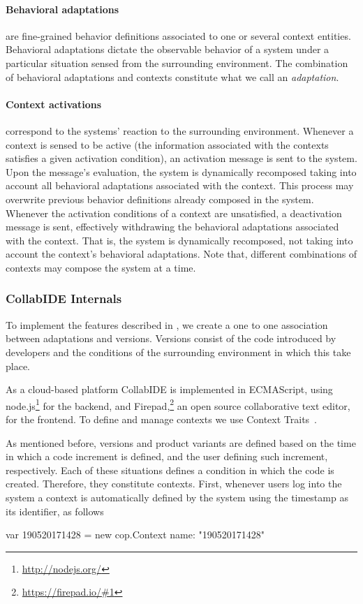 \paragraph{Behavioral adaptations} are fine-grained behavior definitions associated to one or several 
context entities. Behavioral adaptations dictate the observable behavior of a system under a particular 
situation sensed from the surrounding environment. The combination of behavioral adaptations and 
contexts constitute what we call an \emph{adaptation}.

\paragraph{Context activations} correspond to the systems' reaction to the surrounding environment. 
Whenever a context is sensed to be active (the information associated with the contexts satisfies a 
given activation condition), an activation message is sent to the system. Upon the message's 
evaluation, the system is dynamically recomposed taking into account all behavioral adaptations 
associated with the context. This process may overwrite previous behavior definitions already 
composed in the system. Whenever the activation conditions of a context are unsatisfied, a 
deactivation message is sent, effectively withdrawing the behavioral adaptations associated with the 
context. That is, the system is dynamically recomposed, not taking into account the context's 
behavioral adaptations.  Note that, different combinations of contexts may compose the system at a 
time.


\subsubsection{CollabIDE Internals}
To implement the features described in , we create a one to one association 
between adaptations and versions.
Versions consist of the code introduced by developers and the conditions of the surrounding 
environment in which this take place. 

As a cloud-based platform CollabIDE is implemented in ECMAScript, using 
node.js\footnote{\url{http://nodejs.org/}} for the backend, and 
Firepad,\footnote{\url{https://firepad.io/\#1}} 
an open source collaborative text editor, for the frontend.
To define and manage contexts we use Context Traits~\cite{gonzalez13}. 

As mentioned before, versions and product variants are defined based on the time in which a code 
increment is defined, and the user defining such increment, respectively. Each of these situations 
defines a condition in which the code is created. Therefore, they constitute contexts.
First, whenever users log into the system a context is automatically defined by the system 
using the timestamp as its identifier, as follows
\begin{ctxtraits}[]
 var 190520171428 = new cop.Context{
   name: "190520171428"
 }
\end{ctxtraits}

